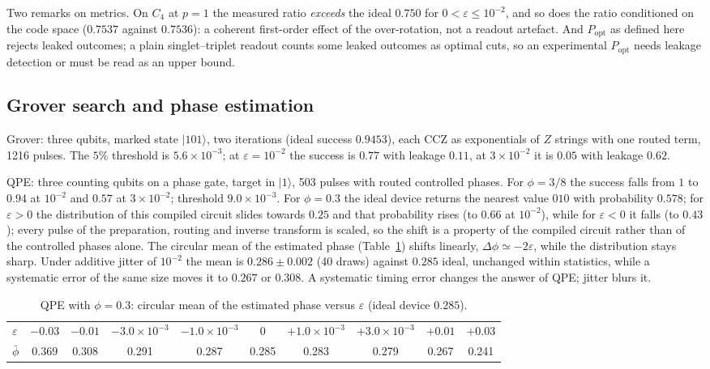 \documentclass[reprint,aps,pra,amsmath,amssymb,superscriptaddress,letterpaper]{revtex4-2}
\newcommand{\GroverThrEps}{5.6\times10^{-3}}
\newcommand{\QPEThrEps}{9.0\times10^{-3}}
\newcommand{\ket}[1]{\lvert #1\rangle}
\newcommand{\Popt}{P_{\mathrm{opt}}}
\begin{document}
Two remarks on metrics. On $C_4$ at $p=1$ the measured ratio \emph{exceeds}
the ideal $0.750$ for $0<\varepsilon\le10^{-2}$, and so does the ratio
conditioned on the code space ($0.7537$ against $0.7536$): a coherent
first-order effect of the over-rotation, not a readout artefact. And $\Popt$
as defined here rejects leaked outcomes; a plain singlet--triplet readout
counts some leaked outcomes as optimal cuts, so an experimental $\Popt$ needs
leakage detection or must be read as an upper bound.

\subsection{Grover search and phase estimation}

Grover: three qubits, marked state $\ket{101}$, two iterations (ideal success
$0.9453$), each CCZ as exponentials of $Z$ strings with one routed term, 1216
pulses. The $5\%$ threshold is $\GroverThrEps$; at $\varepsilon=10^{-2}$ the
success is $0.77$ with leakage $0.11$, at $3\times10^{-2}$ it is $0.05$ with
leakage $0.62$.

QPE: three counting qubits on a phase gate, target in $\ket1$, 503 pulses with
routed controlled phases. For $\phi=3/8$ the success falls from $1$ to $0.94$
at $10^{-2}$ and $0.57$ at $3\times10^{-2}$; threshold $\QPEThrEps$. For
$\phi=0.3$ the ideal device returns the nearest value $010$ with probability
$0.578$; for $\varepsilon>0$ the distribution of this compiled circuit slides towards $0.25$ and that probability rises (to $0.66$ at $10^{-2}$), while for $\varepsilon<0$ it falls (to $0.43$); every pulse of the preparation, routing and inverse transform is scaled, so the shift is a property of the compiled circuit rather than of the controlled phases alone. The circular mean of the estimated phase (Table~\ref{tab:qpe})
shifts linearly, $\Delta\phi\simeq-2\varepsilon$, while the distribution stays
sharp. Under additive jitter of $10^{-2}$ the mean is $0.286\pm0.002$ (40
draws) against $0.285$ ideal, unchanged within statistics, while a systematic
error of the same size moves it to $0.267$ or $0.308$. A systematic timing
error changes the answer of QPE; jitter blurs it.

\begin{table}[t]
\centering\small
\caption{QPE with $\phi=0.3$: circular mean of the estimated phase versus
$\varepsilon$ (ideal device $0.285$).}
\label{tab:qpe}
\begin{tabular}{lccccccccc}
\toprule
$\varepsilon$ & $-0.03$ & $-0.01$ & $-3.0\times10^{-3}$ & $-1.0\times10^{-3}$ & $0$ & $+1.0\times10^{-3}$ & $+3.0\times10^{-3}$ & $+0.01$ & $+0.03$ \\
$\bar\phi$ & 0.369 & 0.308 & 0.291 & 0.287 & 0.285 & 0.283 & 0.279 & 0.267 & 0.241 \\
\bottomrule
\end{tabular}
\end{table}
\end{document}
